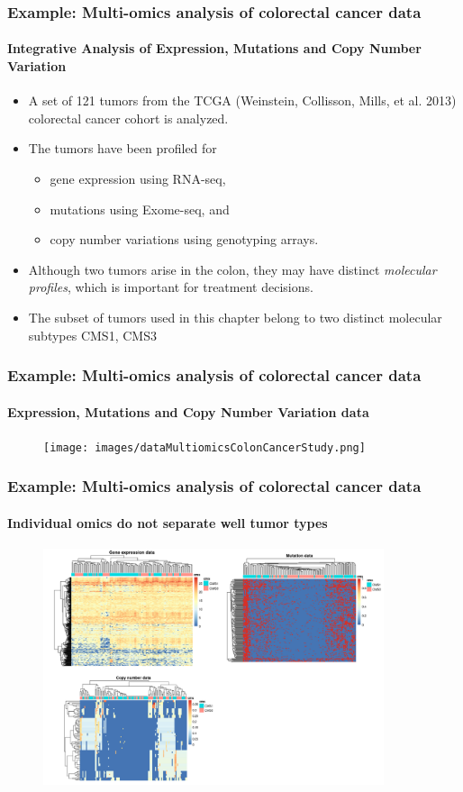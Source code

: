 \documentclass{beamer}
\begin{document}
\begin{frame}
	\frametitle{Example: Multi-omics analysis of colorectal cancer data}
	\framesubtitle{Integrative Analysis of Expression, Mutations and Copy Number Variation}
	
	\begin{itemize}
		\item A set of 121 tumors from the TCGA (Weinstein, Collisson, Mills, et al. 2013) colorectal cancer cohort is analyzed. 
		\item The tumors have been profiled for 
			\begin{itemize} 
				\item gene expression using RNA-seq, 
				\item mutations using Exome-seq, and 
				\item copy number variations using genotyping arrays. 
			\end{itemize}
		\item Although two tumors arise in the colon, they may have distinct \textit{molecular profiles}, which is important for treatment decisions. 
		\item The subset of tumors used in this chapter belong to two distinct molecular subtypes CMS1, CMS3
	\end{itemize}
	
\end{frame}
	
\begin{frame}
	\frametitle{Example: Multi-omics analysis of colorectal cancer data}
	\framesubtitle{Expression, Mutations and Copy Number Variation data}	
	\begin{figure}[ht]
		\centering
		\texttt{[image: images/dataMultiomicsColonCancerStudy.png]}
	\end{figure}
\end{frame}
	
\begin{frame}
	\frametitle{Example: Multi-omics analysis of colorectal cancer data}
	\framesubtitle{Individual omics do not separate well tumor types}	
	\begin{figure}[ht]
		\centering
		\includegraphics[width=100mm]{images/heatmapsMultiomicsColonCancerStudy1.png}
	\end{figure}
\end{frame}
\end{document}
